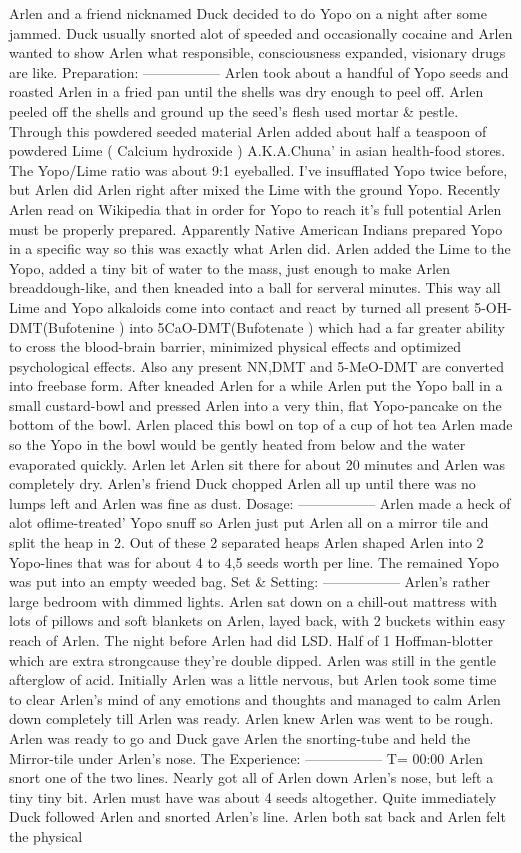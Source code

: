 \documentclass[12pt]{book}
\begin{document}
Arlen and a friend nicknamed Duck decided to do Yopo on a night after some jammed. Duck usually snorted alot of speeded and occasionally cocaine and Arlen wanted to show Arlen what responsible, consciousness expanded, visionary drugs are like. Preparation: ----------------- Arlen took about a handful of Yopo seeds and roasted Arlen in a fried pan until the shells was dry enough to peel off. Arlen peeled off the shells and ground up the seed's flesh used mortar \& pestle. Through this powdered seeded material Arlen added about half a teaspoon of powdered Lime ( Calcium hydroxide ) A.K.A.Chuna' in asian health-food stores. The Yopo/Lime ratio was about 9:1 eyeballed. I've insufflated Yopo twice before, but Arlen did Arlen right after mixed the Lime with the ground Yopo. Recently Arlen read on Wikipedia that in order for Yopo to reach it's full potential Arlen must be properly prepared. Apparently Native American Indians prepared Yopo in a specific way so this was exactly what Arlen did. Arlen added the Lime to the Yopo, added a tiny bit of water to the mass, just enough to make Arlen breaddough-like, and then kneaded into a ball for serveral minutes. This way all Lime and Yopo alkaloids come into contact and react by turned all present 5-OH-DMT(Bufotenine ) into 5CaO-DMT(Bufotenate ) which had a far greater ability to cross the blood-brain barrier, minimized physical effects and optimized psychological effects. Also any present NN,DMT and 5-MeO-DMT are converted into freebase form. After kneaded Arlen for a while Arlen put the Yopo ball in a small custard-bowl and pressed Arlen into a very thin, flat Yopo-pancake on the bottom of the bowl. Arlen placed this bowl on top of a cup of hot tea Arlen made so the Yopo in the bowl would be gently heated from below and the water evaporated quickly. Arlen let Arlen sit there for about 20 minutes and Arlen was completely dry. Arlen's friend Duck chopped Arlen all up until there was no lumps left and Arlen was fine as dust. Dosage: ----------------- Arlen made a heck of alot oflime-treated' Yopo snuff so Arlen just put Arlen all on a mirror tile and split the heap in 2. Out of these 2 separated heaps Arlen shaped Arlen into 2 Yopo-lines that was for about 4 to 4,5 seeds worth per line. The remained Yopo was put into an empty weeded bag. Set \& Setting: ----------------- Arlen's rather large bedroom with dimmed lights. Arlen sat down on a chill-out mattress with lots of pillows and soft blankets on Arlen, layed back, with 2 buckets within easy reach of Arlen. The night before Arlen had did LSD. Half of 1 Hoffman-blotter which are extra strongcause they're double dipped. Arlen was still in the gentle afterglow of acid. Initially Arlen was a little nervous, but Arlen took some time to clear Arlen's mind of any emotions and thoughts and managed to calm Arlen down completely till Arlen was ready. Arlen knew Arlen was went to be rough. Arlen was ready to go and Duck gave Arlen the snorting-tube and held the Mirror-tile under Arlen's nose. The Experience: ----------------- T= 00:00 Arlen snort one of the two lines. Nearly got all of Arlen down Arlen's nose, but left a tiny tiny bit. Arlen must have was about 4 seeds altogether. Quite immediately Duck followed Arlen and snorted Arlen's line. Arlen both sat back and Arlen felt the physical 
\end{document}
